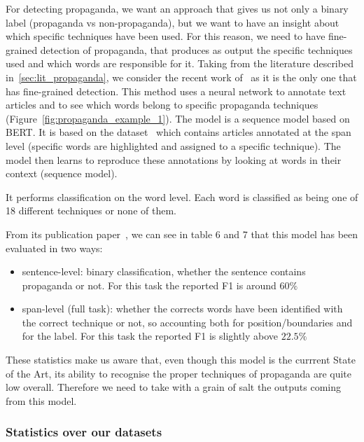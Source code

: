 For detecting propaganda, we want an approach that gives us not only a binary label (propaganda vs non-propaganda), but we want to have an insight about which specific techniques have been used. For this reason, we need to have fine-grained detection of propaganda, that produces as output the specific techniques used and which words are responsible for it.
Taking from the literature described in~\ref{sec:lit_propaganda}, we consider the recent work of~\cite{da2019fine} as it is the only one that has fine-grained detection. This method uses a neural network to annotate text articles and to see which words belong to specific propaganda techniques (Figure~\ref{fig:propaganda_example_1}).
The model is a sequence model based on BERT. It is based on the dataset~\citet{TODO} which contains articles annotated at the span level (specific words are highlighted and assigned to a specific technique). The model then learns to reproduce these annotations by looking at words in their context (sequence model).

It performs classification on the word level. Each word is classified as being one of 18 different techniques or none of them.

From its publication paper~\cite{da2019fine}, we can see in table 6 and 7 that this model has been evaluated in two ways:

\begin{itemize}
    \item sentence-level: binary classification, whether the sentence contains propaganda or not. For this task the reported F1 is around $60\%$
    \item span-level (full task): whether the corrects words have been identified with the correct technique or not, so accounting both for position/boundaries and for the label. For this task the reported F1 is slightly above $22.5\%$
\end{itemize}

These statistics make us aware that, even though this model is the currrent State of the Art, its ability to recognise the proper techniques of propaganda are quite low overall.
Therefore we need to take with a grain of salt the outputs coming from this model.


\subsubsection{\statusred Statistics over our datasets}

